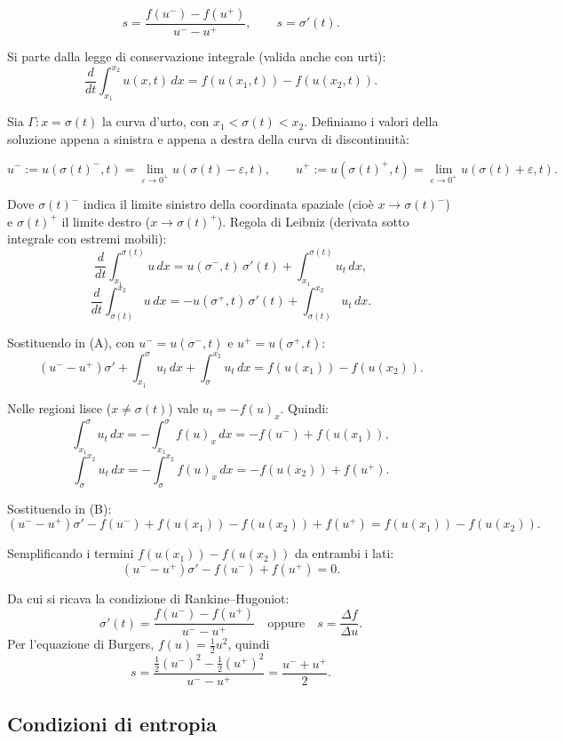 \documentclass[12pt]{article}
\begin{document}
\[
s = \frac{f(u^-)-f(u^+)}{u^- - u^+}, \qquad s=\sigma'(t). \tag{2.4}
\]

Si parte dalla legge di conservazione integrale (valida anche con urti):
\[
\frac{d}{dt} \int_{x_1}^{x_2} u(x,t) \, dx = f(u(x_1,t)) - f(u(x_2,t)). \tag{A}
\]

Sia $\Gamma: x = \sigma(t)$ la curva d'urto, con $x_1 < \sigma(t) < x_2$.
Definiamo i valori della soluzione appena a sinistra e appena a destra della curva di discontinuità:

\[
u^- := u(\sigma(t)^-, t) = \lim_{\varepsilon \to 0^+} u(\sigma(t) - \varepsilon, t), \qquad
u^+ := u(\sigma(t)^+, t) = \lim_{\varepsilon \to 0^+} u(\sigma(t) + \varepsilon, t).
\]

Dove \(\sigma(t)^-\) indica il limite sinistro della coordinata spaziale (cioè \(x \to \sigma(t)^-\)) e \(\sigma(t)^+\) il limite destro (\(x \to \sigma(t)^+\)).
Regola di Leibniz (derivata sotto integrale con estremi mobili):
\[
\frac{d}{dt} \int_{x_1}^{\sigma(t)} u \, dx = u(\sigma^-,t)\,\sigma'(t) + \int_{x_1}^{\sigma(t)} u_t \, dx,
\]
\[
\frac{d}{dt} \int_{\sigma(t)}^{x_2} u \, dx = -u(\sigma^+,t)\,\sigma'(t) + \int_{\sigma(t)}^{x_2} u_t \, dx.
\]

Sostituendo in (A), con $u^- = u(\sigma^-,t)$ e $u^+ = u(\sigma^+,t)$:
\[
(u^- - u^+) \sigma' + \int_{x_1}^{\sigma} u_t \, dx + \int_{\sigma}^{x_2} u_t \, dx = f(u(x_1)) - f(u(x_2)). \tag{B}
\]

Nelle regioni lisce ($x \neq \sigma(t)$) vale $u_t = -f(u)_x$. Quindi:
\[
\int_{x_1}^{\sigma} u_t \, dx = -\int_{x_1}^{\sigma} f(u)_x \, dx = -f(u^-) + f(u(x_1)),
\]
\[
\int_{\sigma}^{x_2} u_t \, dx = -\int_{\sigma}^{x_2} f(u)_x \, dx = -f(u(x_2)) + f(u^+).
\]

Sostituendo in (B):
\[
(u^- - u^+) \sigma' - f(u^-) + f(u(x_1)) - f(u(x_2)) + f(u^+) = f(u(x_1)) - f(u(x_2)).
\]

Semplificando i termini $f(u(x_1)) - f(u(x_2))$ da entrambi i lati:
\[
(u^- - u^+) \sigma' - f(u^-) + f(u^+) = 0.
\]

Da cui si ricava la condizione di Rankine--Hugoniot:
\[
{\displaystyle \sigma'(t) = \frac{f(u^-) - f(u^+)}{u^- - u^+}} \quad \text{oppure} \quad s = \frac{\Delta f}{\Delta u}.
\]
Per l'equazione di Burgers, $f(u)=\frac12 u^2$, quindi
\[
s = \frac{\frac12(u^-)^2-\frac12(u^+)^2}{u^- - u^+}
  = \frac{u^-+u^+}{2}.
\]

\subsection{Condizioni di entropia}
\end{document}
